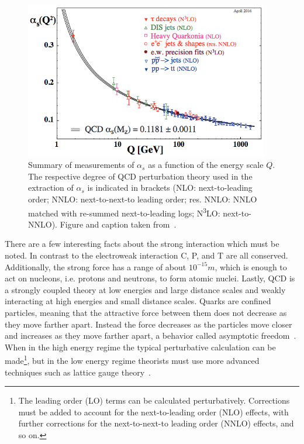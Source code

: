 \begin{figure}[!hbt]
	\begin{center}
		\includegraphics[width=0.95\textwidth]{figures/Chapter2/StrongCouplingConstant.png}
		\caption{Summary of measurements of $\alpha_{s}$ as a function of the energy scale $Q$. The respective degree of QCD perturbation theory used in the extraction of $\alpha_{s}$ is indicated in brackets (NLO: next-to-leading order; NNLO: next-to-next-to leading order; res. NNLO: NNLO matched with re-summed next-to-leading logs; N\textsuperscript{3}LO: next-to-NNLO). Figure and caption taken from~\cite{Olive:2016xmw}.}
		\label{fig:strong_coupling_constant}
	\end{center}
\end{figure}

There are a few interesting facts about the strong interaction which must be noted.
In contrast to the electroweak interaction C, P, and T are all conserved.
Additionally, the strong force has a range of about $10^{-15}\unit{m}$, which is enough to act on nucleons, i.e. protons and neutrons, to form atomic nuclei.
Lastly, QCD is a strongly coupled theory at low energies and large distance scales and weakly interacting at high energies and small distance scales.
Quarks are confined particles, meaning that the attractive force between them does not decrease as they move farther apart.
Instead the force decreases as the particles move closer and increases as they move farther apart, a behavior called asymptotic freedom~\cite{PhysRevLett.30.1343}.
When in the high energy regime the typical perturbative calculation can be made\footnote{The leading order (LO) terms can be calculated perturbatively. Corrections must be added to account for the next-to-leading order (NLO) effects, with further corrections for the next-to-next-to leading order (NNLO) effects, and so on.}, but in the low energy regime theorists must use more advanced techniques such as lattice gauge theory~\cite{Rothe2005}.

